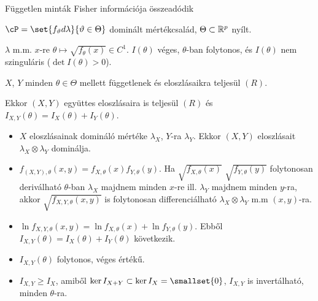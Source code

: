 \documentclass[aspectratio=169,notheorems,9pt,\option]{beamer}
\begin{document}
\begin{frame}{Független minták Fisher információja összeadódik}
    \begin{df}
      $\cP=\set{f_\theta d\lambda}{\theta\in\Theta}$ dominált mértékcsalád, $\Theta\subset\mathbb{R}^p$ nyílt.

      $\lambda$ m.m. $x$-re $\theta\mapsto \sqrt{f_\theta(x)}\in C^1$. %
    $I(\theta)$ véges, $\theta$-ban folytonos, és $I(\theta)$ nem szinguláris ($\det I(\theta)>0$).
    \end{df}
    \begin{proposition}
      $X$, $Y$ minden $\theta\in\Theta$ mellett függetlenek és eloszlásaikra teljesül $(R)$.
  
      Ekkor $(X,Y)$ együttes eloszlásaira is teljesül $(R)$ és $I_{X,Y}(\theta)=I_{X}(\theta)+I_{Y}(\theta)$.
    \end{proposition}
    \begin{itemize}
      \item $X$ eloszlásainak domináló mértéke $\lambda_X$, $Y$-ra $\lambda_Y$. Ekkor $(X,Y)$ eloszlásait 
      $\lambda_X\otimes\lambda_Y$ dominálja. 
      \item $f_{(X,Y),\theta}(x,y)=f_{X,\theta}(x)f_{Y,\theta}(y)$. Ha $\sqrt{f_{X,\theta}(x)}$ $\sqrt{f_{Y,\theta}(y)}$ 
      folytonosan deriválható $\theta$-ban $\lambda_X$ majdnem minden $x$-re ill. $\lambda_Y$ majdnem minden $y$-ra, akkor 
      $\sqrt{f_{X,Y,\theta}(x,y)}$ is folytonosan differenciálható $\lambda_X\otimes\lambda_Y$ m.m $(x,y)$-ra. 
      \item $\ln f_{X,Y,\theta}(x,y)=\ln f_{X,\theta}(x)+\ln f_{Y,\theta}(y)$. 
      Ebből $I_{X,Y}(\theta)=I_X(\theta)+I_{Y}(\theta)$ következik. 
      \item $I_{X,Y}(\theta)$ folytonos, véges értékű.
      \item $I_{X,Y}\geq I_{X}$, amiből $\ker I_{X+Y}\subset \ker I_X=\smallset{0}$, 
      $I_{X,Y}$ is invertálható, minden $\theta$-ra.
    \end{itemize}
  \end{frame}
  
\end{document}

